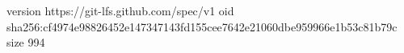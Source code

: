 version https://git-lfs.github.com/spec/v1
oid sha256:cf4974e98826452e147347143fd155cee7642e21060dbe959966e1b53c81b79c
size 994
